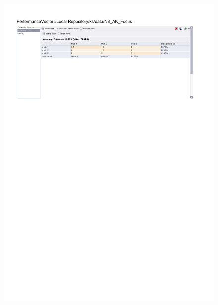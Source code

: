 \begin{figure}[htp]
  \centerline{\includegraphics[trim=0 680 0 60,clip,width=16.09cm]{results/NB_A_Focus.pdf}} \caption{
} \label{NB_K_Focus}
\end{figure}

